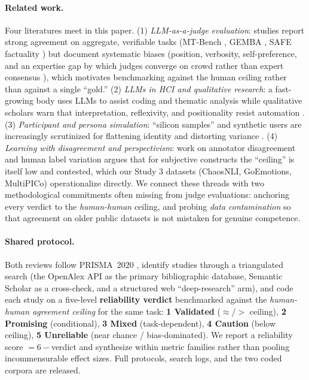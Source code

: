 \paragraph{Related work.} Four literatures meet in this paper. (1) \emph{LLM-as-a-judge evaluation}: studies report
strong agreement on aggregate, verifiable tasks (MT-Bench \citep{zheng2023mtbench}, GEMBA \citep{kocmi2023gembamqm},
SAFE factuality \citep{wei2024safe}) but document systematic biases (position, verbosity, self-preference, and an
expertise gap by which judges converge on crowd rather than expert consensus \citep{bavaresco2024judgebench}), which
motivates benchmarking against the human ceiling rather than against a single ``gold.'' (2) \emph{LLMs in HCI and
qualitative research}: a fast-growing body uses LLMs to assist coding and thematic analysis
\citep{xiao2023support,gao2024collabcoder,dai2023llminloop} while qualitative scholars warn that interpretation,
reflexivity, and positionality resist automation \citep{schroeder2025usestensions,davison2024ethics}. (3)
\emph{Participant and persona simulation}: ``silicon samples'' \citep{argyle2023outofone} and synthetic users are
increasingly scrutinized for flattening identity and distorting variance
\citep{wang2024flatten,cheng2023compost,bisbee2023perils}. (4) \emph{Learning with disagreement and perspectivism}:
work on annotator disagreement and human label variation \citep{calderon2025alttest} argues that for subjective
constructs the ``ceiling'' is itself low and contested, which our Study 3 datasets (ChaosNLI, GoEmotions, MultiPICo)
operationalize directly. We connect these threads with two methodological commitments often missing from
judge evaluations: anchoring every verdict to the \emph{human-human} ceiling, and probing \emph{data contamination}
so that agreement on older public datasets is not mistaken for genuine competence.

\paragraph{Shared protocol.} Both reviews follow PRISMA~2020 \citep{page2021prisma}, identify studies through a
triangulated search (the OpenAlex API as the primary bibliographic database, Semantic Scholar as a cross-check, and
a structured web ``deep-research'' arm), and code each study on a five-level \textbf{reliability verdict}
benchmarked against the \emph{human-human agreement ceiling} for the same task: \textbf{1 Validated}
($\approx$/$>$ ceiling), \textbf{2 Promising} (conditional), \textbf{3 Mixed} (task-dependent), \textbf{4 Caution}
(below ceiling), \textbf{5 Unreliable} (near chance / bias-dominated). We report a reliability score $=6-$verdict
and synthesize within metric families rather than pooling incommensurable effect sizes. Full protocols, search
logs, and the two coded corpora are released.

